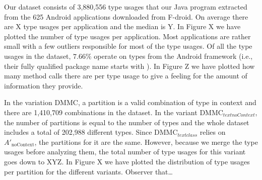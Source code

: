 
Our dataset consists of 3,880,556 type usages that our Java program extracted from the 625 Android applications downloaded from F-droid.
On average there are X type usages per application and the median is Y.
In Figure X we have plotted the number of type usages per application.
Most applications are rather small with a few outliers responsible for most of the type usages.
Of all the type usages in the dataset, $7.66\%$ operate on types from the Android framework (i.e., their fully qualified package name starts with ).
In Figure Z we have plotted how many method calls there are per type usage to give a feeling for the amount of information they provide.

In the variation $\text{DMMC}$, a partition is a valid combination of type in context and there are 1,410,709 combinations in the dataset.
In the variant $\text{DMMC}_{text{noContext}}$, the number of partitions is equal to the number of types and the whole dataset includes a total of 202,988 different types.
Since $\text{DMMC}_{text{class}}$ relies on $A'_\text{noContext}$, the partitions for it are the same.
However, because we merge the type usages before analyzing them, the total number of type usages for this variant goes down to XYZ.
In Figure X we have plotted the distribution of type usages per partition for the different variants.
Observer that\ldots 
{}


